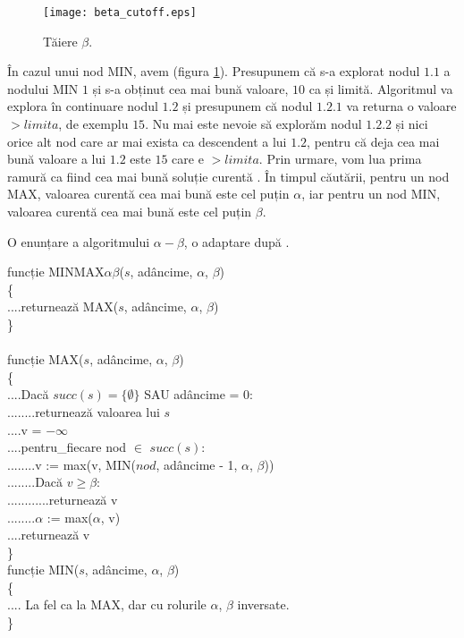 \documentclass[12pt,twoside,a4paper,fleqn]{book}
\theoremstyle{definition}
\begin{document}
\begin{figure}[h]
\begin{center}
\texttt{[image: beta\_cutoff.eps]}
\caption{\small{Tăiere $\beta$.}}
\label{fig:beta_cutoff}
\end{center}
\end{figure}

În cazul unui nod MIN, avem (figura \ref{fig:beta_cutoff}). Presupunem că s-a explorat nodul $1.1$ a nodului MIN $1$ și s-a obținut cea mai bună valoare, $10$ ca și limită. Algoritmul va explora în continuare nodul $1.2$ și presupunem că nodul $1.2.1$ va returna o valoare $ > limita$, de exemplu $15$. Nu mai este nevoie să explorăm nodul $1.2.2$ și nici orice alt nod care ar mai exista ca descendent a lui $1.2$, pentru că deja cea mai bună valoare a lui $1.2$ este $15$ care e $> limita$. Prin urmare, vom lua prima ramură ca fiind cea mai bună soluție curentă \cite{sheng_hsu}. În timpul căutării, pentru un nod MAX, valoarea curentă cea mai bună este cel puțin $\alpha$, iar 
pentru un nod MIN, valoarea curentă cea mai bună este cel puțin $\beta$.

O enunțare a algoritmului $\alpha-\beta$, o adaptare după \cite{dana_nau_game_tree_search_}.
\begin{pseudocod}
funcție MINMAX$\alpha \beta$($s$, adâncime, $\alpha$, $\beta$)\\
\{\\
....returnează MAX($s$, adâncime, $\alpha$, $\beta$)\\
\}\\
\\
funcție MAX($s$, adâncime, $\alpha$, $\beta$)\\
\{\\
....Dacă $succ(s) = \{\emptyset\}$ SAU adâncime = $0$:\\
........returnează valoarea lui $s$\\

....v = $-\infty$\\
....pentru\_fiecare nod $\in$ $succ(s)$:\\
........v := max(v, MIN($nod$, adâncime - 1, $\alpha$, $\beta$))\\
........Dacă $v \geq \beta$:\\
............returnează v\\
........$\alpha$ := max($\alpha$, v)\\
....returnează v\\
\}\\

funcție MIN($s$, adâncime, $\alpha$, $\beta$)\\
\{\\
.... La fel ca la MAX, dar cu rolurile $\alpha$, $\beta$ inversate.\\
\}


\caption{Algoritmul MINMAX cu $\alpha \beta$}
\end{pseudocod}
\end{document}
